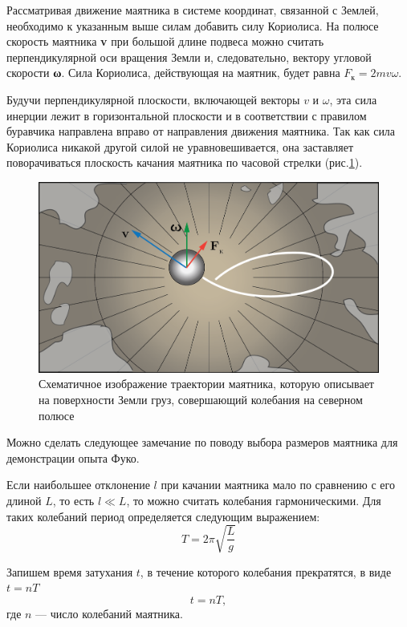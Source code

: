 \documentclass[14pt,a4paper,oneside]{extarticle}	%
\begin{document}
	Рассматривая движение маятника в системе координат, связанной с Землей, необходимо к указанным выше силам добавить силу Кориолиса.
	На полюсе скорость маятника \textbf{v} при большой длине подвеса можно считать перпендикулярной оси вращения Земли и, следовательно, вектору угловой скорости \textbf{ω}.
	Сила Кориолиса, действующая на маятник, будет равна 
	$ F_{\text{к}} = 2mv\omega $.
	
	Будучи перпендикулярной плоскости, включающей векторы $ v $  и $ \omega $, эта сила инерции лежит в горизонтальной плоскости и в соответствии с правилом буравчика направлена вправо от направления движения маятника. 
	Так как сила Кориолиса никакой другой силой не уравновешивается, она заставляет поворачиваться плоскость качания маятника по часовой стрелки (рис.\ref{fuko-5}).

	\begin{figure}[H] 	
		\centering 	
		\includegraphics[width=0.75\linewidth]{fuko-5.png}
		\caption{Схематичное изображение траектории маятника, которую описывает на поверхности Земли груз, совершающий колебания на северном полюсе}
		\label{fuko-5}
	\end{figure}
	
	Можно сделать следующее замечание по поводу выбора размеров маятника для демонстрации опыта Фуко. 
	
	Если наибольшее отклонение $ l $ при качании маятника мало по сравнению с его длиной $ L $, то есть $ l \ll L $, то можно считать колебания гармоническими.
	Для таких колебаний период определяется следующим выражением:
	\begin{equation}\label{fuko-1eq1}
	T = 2\pi \sqrt{\frac{L}{g}}
	\end{equation}
	
	Запишем время затухания $ t $, в течение которого колебания прекратятся, в виде $ t = nT $
	\begin{equation}\label{fuko-1eq2}
	t = nT,
	\end{equation}
	где $ n $ — число колебаний маятника.
	
\end{document}
